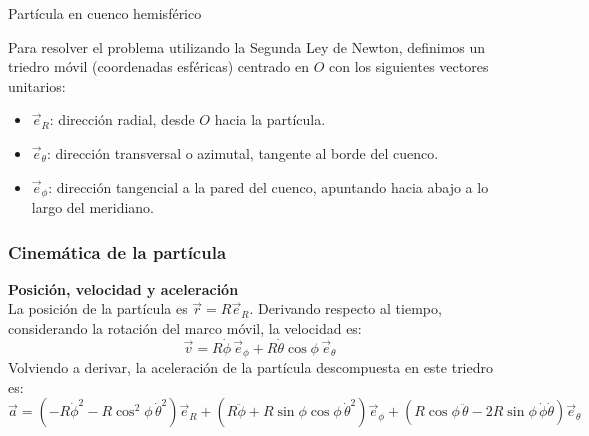 \begin{solucion}{Partícula en cuenco hemisférico}

Para resolver el problema utilizando la Segunda Ley de Newton, definimos un triedro móvil (coordenadas esféricas) centrado en $O$ con los siguientes vectores unitarios:
\begin{itemize}
    \item $\vec{e}_R$: dirección radial, desde $O$ hacia la partícula.
    \item $\vec{e}_\theta$: dirección transversal o azimutal, tangente al borde del cuenco.
    \item $\vec{e}_\phi$: dirección tangencial a la pared del cuenco, apuntando hacia abajo a lo largo del meridiano.
\end{itemize}

\subsubsection*{Cinemática de la partícula}
\textbf{Posición, velocidad y aceleración}\\
La posición de la partícula es $\vec{r} = R \vec{e}_R$. Derivando respecto al tiempo, considerando la rotación del marco móvil, la velocidad es:
$$\vec{v} = R\dot{\phi}\, \vec{e}_\phi + R\dot{\theta}\cos\phi\, \vec{e}_\theta$$
Volviendo a derivar, la aceleración de la partícula descompuesta en este triedro es:
$$\vec{a} = (-R\dot{\phi}^2 - R\cos^2\phi\,\dot{\theta}^2)\vec{e}_R + (R\ddot{\phi} + R\sin\phi\cos\phi\,\dot{\theta}^2)\vec{e}_\phi + (R\cos\phi\,\ddot{\theta} - 2R\sin\phi\,\dot{\phi}\dot{\theta})\vec{e}_\theta$$



\end{solucion}
